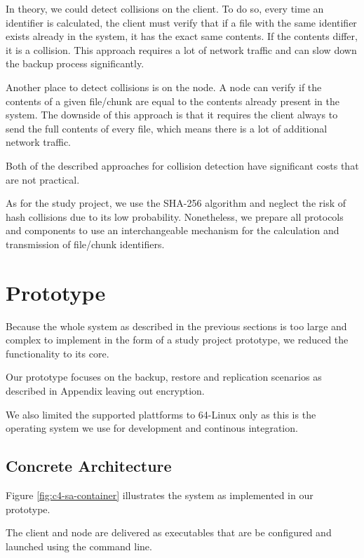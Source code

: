 In theory, we could detect collisions on the \gls{client}. To do so, every time an identifier is calculated, the \gls{client} must verify that if a file with the same identifier exists already in the system, it has the exact same contents. If the contents differ, it is a collision. This approach requires a lot of network traffic and can slow down the backup process significantly.

Another place to detect collisions is on the \gls{node}. A \gls{node} can verify if the contents of a given file/chunk are equal to the contents already present in the system. The downside of this approach is that it requires the \gls{client} always to send the full contents of every file, which means there is a lot of additional network traffic.

Both of the described approaches for collision detection have significant costs that are not practical.

As for the study project, we use the SHA-256 algorithm\cite{sha-256} and neglect the risk of hash collisions due to its low probability. Nonetheless, we prepare all protocols and components to use an interchangeable mechanism for the calculation and transmission of file/chunk identifiers.

\section{Prototype}

Because the whole system as described in the previous sections is too large and complex to implement in the form of a study project prototype, we reduced the functionality to its core.

Our prototype focuses on the backup, restore and replication scenarios as described in Appendix  leaving out encryption.

We also limited the supported plattforms to 64-Linux only as this is the operating system we use for development and continous integration.

\subsection{Concrete Architecture}

Figure \ref{fig:c4-sa-container} illustrates the system as implemented in our prototype.

The \gls{client} and \gls{node} are delivered as executables that are be configured and launched using the command line.

